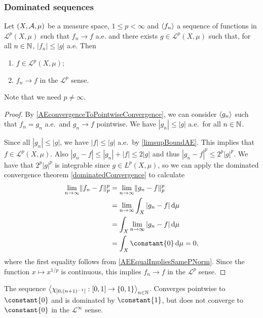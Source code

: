 \subsubsection{Dominated sequences}
\begin{proposition} \label{dominatedConvergenceLpVersion}
Let $\sSet{X,\mathcal{A},\mu}$ be a measure space, $1 \leq p < \infty$ and $\left\langle f_n \right\rangle$ a sequence of functions in $\mathcal{L}^p(X,\mu)$ such that $f_n \to f$ a.e. and there exists $g\in \mathcal{L}^p(X,\mu)$ such that, for all $n\in \mathbb{N}$, $|f_n| \leq |g|$ a.e. Then
\begin{enumerate}
\item $f\in \mathcal{L}^p(X,\mu)$;
\item $f_n \to f$ in the $\mathcal{L}^p$ sense.
\end{enumerate}
\end{proposition}
Note that we need $p \neq \infty$.
\begin{proof}
By \ref{AEconvergenceToPointwiseConvergence}, we can consider $\left\langle g_n \right\rangle$ such that $f_n = g_n$ a.e.\ and $g_n \to f$ pointwise. We have $|g_n| \leq |g|$ a.e.\ for all $n\in \mathbb{N}$.

Since all $|g_n| \leq |g|$, we have $|f| \leq |g|$ a.e.\ by \ref{limsupBoundAE}. This implies that $f\in \mathcal{L}^p(X,\mu)$. Also $|g_n - f| \leq |g_n| + |f| \leq 2|g|$ and thus $|g_n - f|^p \leq 2^p|g|^p$. We have that $2^p|g|^p$ is integrable since $g\in L^p(X,\mu)$, so we can apply the dominated convergence theorem \ref{dominatedConvergence} to calculate
\begin{align*}
\lim_{n\to \infty}\norm{f_n - f}_p^p &= \lim_{n\to \infty}\norm{g_n - f}_p^p \\
&= \lim_{n\to \infty}\int_X |g_n - f| \diff{\mu} \\
&= \int_X \lim_{n\to \infty}|g_n - f| \diff{\mu} \\ 
&= \int_X \constant{0} \diff{\mu} = 0,
\end{align*}
where the first equality follows from \ref{AEEqualImpliesSamePNorm}.
Since the function $x\mapsto x^{1/p}$ is continuous, this implies $f_n \to f$ in the $\mathcal{L}^p$ sense.
\end{proof}

\begin{example}
The sequence $\seq{\charFunc{\interval[o]{0,(n+1)^{-1}}}: \interval{0,1} \to \{0,1\}}_{n\in \N}$. Converges pointwise to $\constant{0}$ and is dominated by $\constant{1}$, but does not converge to $\constant{0}$ in the $\mathcal{L}^\infty$ sense.
\end{example}

